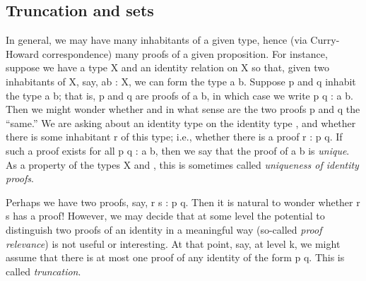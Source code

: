 \documentclass[a4paper,UKenglish,cleveref,autoref,thm-restate]{lipics-v2021}
\begin{document}
\subsection{Truncation and sets}\label{ssec:truncation-and-sets}
In general, we may have many inhabitants of a given type, hence (via Curry-Howard correspondence) many proofs of a given proposition. For instance, suppose we have a type \ab X and an identity relation  on \ab X so that, given two inhabitants of \ab X, say, \ab a\AgdaSpace{}\ab b \as : \ab X, we can form the type \ab a  \ab b. Suppose \ab p and \ab q inhabit the type \ab a  \ab b; that is, \ab p and \ab q are proofs of \ab a  \ab b, in which case we write \ab p \ab q : \ab a  \ab b. Then we might wonder whether and in what sense are the two proofs \ab p and \ab q the ``same.'' We are asking about an identity type on the identity type , and whether there is some inhabitant \ab r of this type; i.e., whether there is a proof \ab r : \ab p  \ab q.  If such a proof exists for all \ab p \ab q : \ab a  \ab b, then we say that the proof of \ab a  \ab b is \emph{unique}. As a property of the types \ab X and , this is sometimes called \emph{uniqueness of identity proofs}.

Perhaps we have two proofs, say, \ab r \ab s : \ab p  \ab q. Then it is natural to wonder whether \ab r  \ab s has a proof!  However, we may decide that at some level the potential to distinguish two proofs of an identity in a meaningful way (so-called \emph{proof relevance}) is not useful or interesting. At that point, say, at level \ab k, we might assume that there is at most one proof of any identity of the form \ab p   \ab q. This is called \emph{truncation}.
\end{document}
